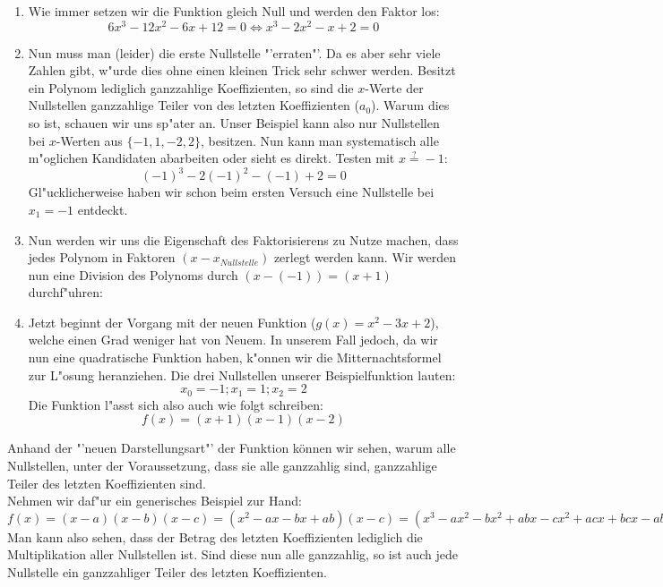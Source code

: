\begin{enumerate}
\item Wie immer setzen wir die Funktion gleich Null und werden den Faktor los:
\begin{equation*}
6x^3 - 12x^2 - 6x + 12 = 0 \iff x^3 -2x^2 - x + 2 = 0
\end{equation*}

\item Nun muss man (leider) die erste Nullstelle "'erraten"'. Da es aber sehr viele Zahlen gibt, w"urde dies ohne einen kleinen Trick sehr schwer werden. Besitzt ein Polynom lediglich ganzzahlige Koeffizienten, so sind die $x$-Werte der Nullstellen ganzzahlige Teiler von des letzten Koeffizienten ($a_0$). Warum dies so ist, schauen wir uns sp"ater an. Unser Beispiel kann also nur Nullstellen bei $x$-Werten aus $\{-1, 1, -2, 2\}$, besitzen. Nun kann man systematisch alle m"oglichen Kandidaten abarbeiten oder sieht es direkt. Testen mit $x \stackrel{?}{=} -1$:
\begin{equation*}
(-1)^3 - 2(-1)^2 - (-1) + 2 = 0
\end{equation*}
Gl"ucklicherweise haben wir schon beim ersten Versuch eine Nullstelle bei $x_1 = -1$ entdeckt.
\item Nun werden wir uns die Eigenschaft des Faktorisierens zu Nutze machen, dass jedes Polynom in Faktoren $(x-x_{Nullstelle})$ zerlegt werden kann. Wir werden nun eine Division des Polynoms durch $(x-(-1)) = (x + 1)$ durchf"uhren:

\item Jetzt beginnt der Vorgang mit der neuen Funktion ($g(x) = x^2 - 3x + 2$), welche einen Grad weniger hat von Neuem. In unserem Fall jedoch, da wir nun eine quadratische Funktion haben, k"onnen wir die Mitternachtsformel zur L"osung heranziehen. Die drei Nullstellen unserer Beispielfunktion lauten:
\begin{equation*}
x_0 = -1; x_1 = 1; x_2 = 2
\end{equation*}
Die Funktion l"asst sich also auch wie folgt schreiben:
\begin{equation*}
f(x)=(x+1)(x-1)(x-2)
\end{equation*}
\end{enumerate}
Anhand der "'neuen Darstellungsart"' der Funktion können wir sehen, warum alle Nullstellen, unter der Voraussetzung, dass sie alle ganzzahlig sind, ganzzahlige Teiler des letzten Koeffizienten sind.\\
Nehmen wir daf"ur ein generisches Beispiel zur Hand:\\
$f(x)=(x-a)(x-b)(x-c)=(x^2 - ax - bx + ab)(x-c)=(x^3 - ax^2 - bx^2 + abx - cx^2 + acx + bcx - abc)$\\
Man kann also sehen, dass der Betrag des letzten Koeffizienten lediglich die Multiplikation aller Nullstellen ist. Sind diese nun alle ganzzahlig, so ist auch jede Nullstelle ein ganzzahliger Teiler des letzten Koeffizienten.